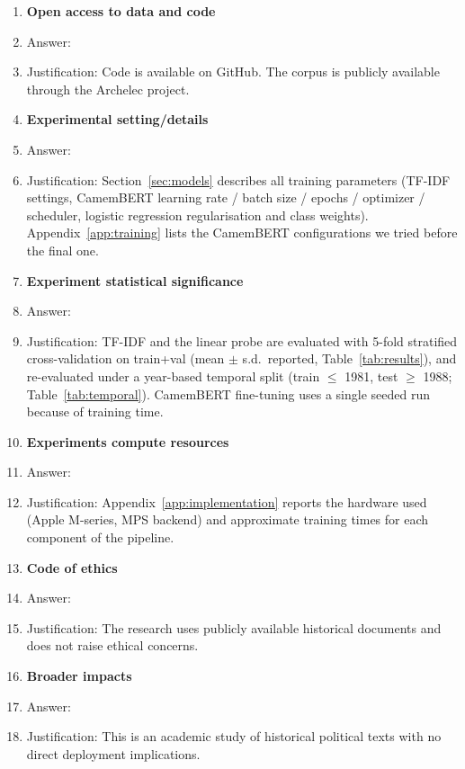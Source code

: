 \begin{enumerate}
\item {\bf Open access to data and code}
    \item[] Answer: \answerYes{}
    \item[] Justification: Code is available on GitHub. The corpus is publicly available through the Archelec project.

\item {\bf Experimental setting/details}
    \item[] Answer: \answerYes{}
    \item[] Justification: Section~\ref{sec:models} describes all training parameters (TF-IDF settings, CamemBERT learning rate / batch size / epochs / optimizer / scheduler, logistic regression regularisation and class weights). Appendix~\ref{app:training} lists the CamemBERT configurations we tried before the final one.

\item {\bf Experiment statistical significance}
    \item[] Answer: \answerYes{}
    \item[] Justification: TF-IDF and the linear probe are evaluated with 5-fold stratified cross-validation on train+val (mean $\pm$ s.d.\ reported, Table~\ref{tab:results}), and re-evaluated under a year-based temporal split (train $\leq$ 1981, test $\geq$ 1988; Table~\ref{tab:temporal}). CamemBERT fine-tuning uses a single seeded run because of training time.

\item {\bf Experiments compute resources}
    \item[] Answer: \answerYes{}
    \item[] Justification: Appendix~\ref{app:implementation} reports the hardware used (Apple M-series, MPS backend) and approximate training times for each component of the pipeline.

\item {\bf Code of ethics}
    \item[] Answer: \answerYes{}
    \item[] Justification: The research uses publicly available historical documents and does not raise ethical concerns.

\item {\bf Broader impacts}
    \item[] Answer: \answerNA{}
    \item[] Justification: This is an academic study of historical political texts with no direct deployment implications.


\end{enumerate}
